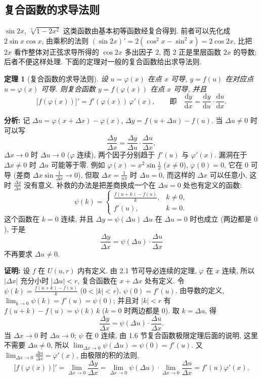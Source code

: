 \documentclass[UTF8,openany]{ctexbook}
\theoremstyle{chinesetextbook}
\newtheorem{theorem}{定理}[section]
\newenvironment{cnproof}{\par\indent\textbf{证明:} \ignorespaces}{\par}
\newcommand{\dd}{\mathrm d}
\begin{document}
\subsection{复合函数的求导法则}
$\sin2x$, $\sqrt[3]{1-2x^2}$ 这类函数由基本初等函数经复合得到. 前者可以先化成 $2\sin x\cos x$, 由乘积的法则 $(\sin2x)'=2(\cos^2x-\sin^2x)=2\cos2x$, 比把 $2x$ 看作整体对正弦求导所得的 $\cos2x$ 多出因子 $2$, 而 $2$ 正是里层函数 $2x$ 的导数; 后者不便这样处理. 下面的定理对一般的复合函数给出求导法则.
\begin{theorem}[复合函数的求导法则]\label{thm:c2-2-chain}
设 $u=\varphi(x)$ 在点 $x$ 可导, $y=f(u)$ 在对应点 $u=\varphi(x)$ 可导. 则复合函数 $y=f(\varphi(x))$ 在点 $x$ 可导, 并且
\[
\bigl[f(\varphi(x))\bigr]'=f'(\varphi(x))\,\varphi'(x),\qquad\text{即}\quad\frac{\dd y}{\dd x}=\frac{\dd y}{\dd u}\cdot\frac{\dd u}{\dd x}.
\]
\end{theorem}
\par\indent\textbf{分析:} 记 $\Delta u=\varphi(x+\Delta x)-\varphi(x)$, $\Delta y=f(u+\Delta u)-f(u)$. 当 $\Delta u\ne0$ 时可以写
\[
\frac{\Delta y}{\Delta x}=\frac{\Delta y}{\Delta u}\cdot\frac{\Delta u}{\Delta x},
\]
$\Delta x\to0$ 时 $\Delta u\to0$ ($\varphi$ 连续), 两个因子分别趋于 $f'(u)$ 与 $\varphi'(x)$. 漏洞在于 $\Delta x\ne0$ 时 $\Delta u$ 可能等于零. 例如 $\displaystyle\varphi(x)=x^2\sin\frac1x$ ($x\ne0$), $\varphi(0)=0$, 它在 $0$ 可导 (差商 $\displaystyle\Delta x\sin\frac1{\Delta x}\to0$), 但取 $\displaystyle\Delta x=\frac1{n\pi}$ 时 $\Delta u=0$, 而这样的 $\Delta x$ 可以任意小, 这时 $\displaystyle\frac{\Delta y}{\Delta u}$ 没有意义. 补救的办法是把差商换成一个在 $\Delta u=0$ 处也有定义的函数:
\[
\psi(k)=\begin{cases}\frac{f(u+k)-f(u)}k,&k\ne0,\\f'(u),&k=0.\end{cases}
\]
这个函数在 $k=0$ 连续, 并且 $\Delta y=\psi(\Delta u)\,\Delta u$ 在 $\Delta u=0$ 时也成立 (两边都是 $0$), 于是
\[
\frac{\Delta y}{\Delta x}=\psi(\Delta u)\cdot\frac{\Delta u}{\Delta x}
\]
不再要求 $\Delta u\ne0$.
\begin{cnproof}
设 $f$ 在 $U(u,r)$ 内有定义. 由 2.1 节可导必连续的定理, $\varphi$ 在 $x$ 连续, 所以 $|\Delta x|$ 充分小时 $|\Delta u|<r$, 复合函数在 $x+\Delta x$ 处有定义. 令 $\displaystyle\psi(k)=\frac{f(u+k)-f(u)}k$ ($0<|k|<r$), $\psi(0)=f'(u)$. 由导数的定义, $\displaystyle\lim_{k\to0}\psi(k)=f'(u)=\psi(0)$; 并且对 $|k|<r$ 有 $f(u+k)-f(u)=\psi(k)\,k$ ($k=0$ 时两边都是 $0$). 取 $k=\Delta u$, 得
\[
\frac{\Delta y}{\Delta x}=\psi(\Delta u)\cdot\frac{\Delta u}{\Delta x}.
\]
当 $\Delta x\to0$ 时 $\Delta u\to0$; $\psi$ 在 $0$ 连续, 由 1.6 节复合函数极限定理后面的说明, 这里不需要 $\Delta u\ne0$, 所以 $\displaystyle\lim_{\Delta x\to0}\psi(\Delta u)=\psi(0)=f'(u)$. 又 $\displaystyle\lim_{\Delta x\to0}\frac{\Delta u}{\Delta x}=\varphi'(x)$, 由极限的积的法则,
\[
\bigl[f(\varphi(x))\bigr]'=\lim_{\Delta x\to0}\frac{\Delta y}{\Delta x}=\lim_{\Delta x\to0}\psi(\Delta u)\cdot\lim_{\Delta x\to0}\frac{\Delta u}{\Delta x}=f'(u)\varphi'(x).
\]
\end{cnproof}
\end{document}
